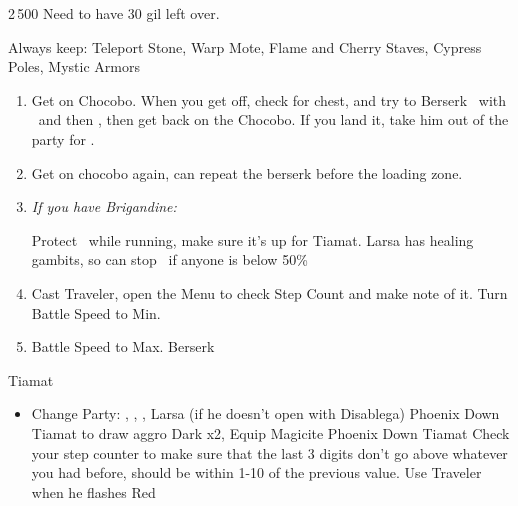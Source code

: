 \begin{shop}{2\,500}
Need to have 30 gil left over.

Always keep: Teleport Stone, Warp Mote, Flame and Cherry Staves, Cypress Poles, Mystic Armors
\end{shop}
\begin{enumerate}
	\item Get on Chocobo. When you get off, check for chest, and try to Berserk \basch\ with \penelo\ and then \vaan, then get back on the Chocobo. If you land it, take him out of the party for \balthier.
	\item Get on chocobo again, can repeat the berserk before the loading zone.
	     \item \textit{If you have Brigandine:}
	     \begin{enumerate}
	     	\vaanf Protect \vaan\ while running, make sure it's up for Tiamat. Larsa has healing gambits, so can stop \flee\ if anyone is below 50\%
		\end{enumerate}
	\item Cast Traveler, open the Menu to check Step Count and make note of it. Turn Battle Speed to Min.
	\item Battle Speed to Max. Berserk \balthier
\end{enumerate}
\begin{battle}{Tiamat}
	\begin{itemize}
		\item Change Party: \vaan, \balthier, \basch, Larsa (if he doesn't open with Disablega)
		\vaanf Phoenix Down Tiamat to draw aggro
		\vaanf Dark x2, Equip Magicite
		\vaanf Phoenix Down Tiamat
	      \balthierf Check your step counter to make sure that the last 3 digits don't go above whatever you had before, should be within 1-10 of the previous value. Use Traveler when he flashes Red
	\end{itemize}
\end{battle}
